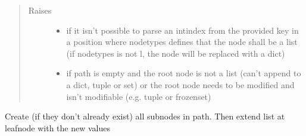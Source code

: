 \documentclass[a4paper,10pt,english]{sphinxmanual}
\begin{document}
\begin{fulllineitems}
\begin{fulllineitems}
\begin{quote}
\begin{description}
\item[{Raises}] \leavevmode\begin{itemize}
\item {}
\sphinxAtStartPar
{} \textendash{} if it isn’t possible to parse an int\sphinxhyphen{}index from the provided key in a position where node\sphinxhyphen{}types
    defines that the node shall be a list (if node\sphinxhyphen{}types is not l, the node will be replaced with a dict)

\item {}
\sphinxAtStartPar
{} \textendash{} if path is empty and the root node is not a list (can’t append to a dict, tuple or set) or the
    root node needs to be modified and isn’t modifiable (e.g. tuple or frozenset)

\end{itemize}

\end{description}\end{quote}

\end{fulllineitems}


\begin{fulllineitems}
\label{\detokenize{fagus.fagus:fagus.fagus.Fagus.extend}}
\pysigstartsignatures
{}
\pysigstopsignatures
\sphinxAtStartPar
Create (if they don’t already exist) all sub\sphinxhyphen{}nodes in path. Then extend list at leaf\sphinxhyphen{}node with the new values


\end{fulllineitems}
\end{fulllineitems}
\end{document}
